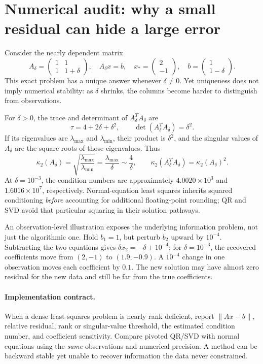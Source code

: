 \clearpage
\section*{Numerical audit: why a small residual can hide a large error}
\noindent Consider the nearly dependent matrix
\[
A_\delta=\begin{pmatrix}1&1\\1&1+\delta\end{pmatrix},
\quad
A_\delta x=b,\quad
x_*=\begin{pmatrix}2\\-1\end{pmatrix},
\quad
b=\begin{pmatrix}1\\1-\delta\end{pmatrix}.
\]
This exact problem has a unique answer whenever \(\delta\ne0\).
Yet uniqueness does not imply numerical stability: as \(\delta\)
shrinks, the columns become harder to distinguish from observations.

For \(\delta>0\), the trace and determinant of \(A_\delta^TA_\delta\) are
\[
\tau=4+2\delta+\delta^2,\qquad
\det(A_\delta^TA_\delta)=\delta^2.
\]
If its eigenvalues are \(\lambda_{\max}\) and \(\lambda_{\min}\),
their product is \(\delta^2\), and the singular values of \(A_\delta\)
are the square roots of those eigenvalues. Thus
\[
\kappa_2(A_\delta)
=\sqrt{\frac{\lambda_{\max}}{\lambda_{\min}}}
=\frac{\lambda_{\max}}{\delta}
\sim\frac4\delta,\qquad
\kappa_2(A_\delta^TA_\delta)=\kappa_2(A_\delta)^2.
\]
At \(\delta=10^{-3}\), the condition numbers are approximately
\(4.0020\times10^3\) and \(1.6016\times10^7\), respectively.
Normal-equation least squares inherits squared conditioning
\emph{before} accounting for additional floating-point rounding;
QR and SVD avoid that particular squaring in their solution pathways.

An observation-level illustration exposes the underlying information
problem, not just the algorithmic one. Hold \(b_1=1\), but perturb
\(b_2\) upward by \(10^{-4}\). Subtracting the two equations gives
\(\delta x_2=-\delta+10^{-4}\); for \(\delta=10^{-3}\),
the recovered coefficients move from \((2,-1)\) to
\((1.9,-0.9)\). A \(10^{-4}\) change in one observation
moves each coefficient by \(0.1\).
The new solution may have almost zero residual for the new data and
still be far from the true coefficients.

\paragraph{Implementation contract.}
When a dense least-squares problem is nearly rank deficient, report
\(\lVert Ax-b\rVert\), relative residual, rank or singular-value threshold,
the estimated condition number, and coefficient sensitivity.
Compare pivoted QR/SVD with normal equations using the \emph{same}
observations and numerical precision. A method can be backward stable
yet unable to recover information the data never constrained.

